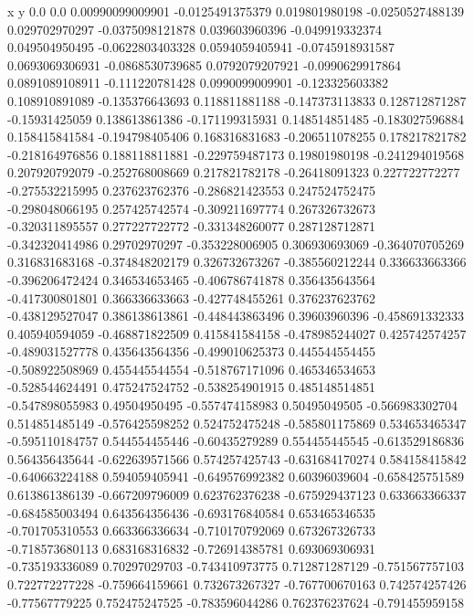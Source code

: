               x                y
            0.0              0.0
0.00990099009901  -0.0125491375379
 0.019801980198  -0.0250527488139
 0.029702970297  -0.0375098121878
 0.039603960396  -0.049919332374
 0.049504950495  -0.0622803403328
0.0594059405941  -0.0745918931587
0.0693069306931  -0.0868530739685
0.0792079207921  -0.0990629917864
0.0891089108911  -0.111220781428
0.0990099009901  -0.123325603382
 0.108910891089  -0.135376643693
 0.118811881188  -0.147373113833
 0.128712871287   -0.15931425059
 0.138613861386  -0.171199315931
 0.148514851485  -0.183027596884
 0.158415841584  -0.194798405406
 0.168316831683  -0.206511078255
 0.178217821782  -0.218164976856
 0.188118811881  -0.229759487173
  0.19801980198  -0.241294019568
 0.207920792079  -0.252768008669
 0.217821782178   -0.26418091323
 0.227722772277  -0.275532215995
 0.237623762376  -0.286821423553
 0.247524752475  -0.298048066195
 0.257425742574  -0.309211697774
 0.267326732673  -0.320311895557
 0.277227722772  -0.331348260077
 0.287128712871  -0.342320414986
  0.29702970297  -0.353228006905
 0.306930693069  -0.364070705269
 0.316831683168  -0.374848202179
 0.326732673267  -0.385560212244
 0.336633663366  -0.396206472424
 0.346534653465  -0.406786741878
 0.356435643564  -0.417300801801
 0.366336633663  -0.427748455261
 0.376237623762  -0.438129527047
 0.386138613861  -0.448443863496
  0.39603960396  -0.458691332333
 0.405940594059  -0.468871822509
 0.415841584158  -0.478985244027
 0.425742574257  -0.489031527778
 0.435643564356  -0.499010625373
 0.445544554455  -0.508922508969
 0.455445544554  -0.518767171096
 0.465346534653  -0.528544624491
 0.475247524752  -0.538254901915
 0.485148514851  -0.547898055983
  0.49504950495  -0.557474158983
  0.50495049505  -0.566983302704
 0.514851485149  -0.576425598252
 0.524752475248  -0.585801175869
 0.534653465347  -0.595110184757
 0.544554455446   -0.60435279289
 0.554455445545  -0.613529186836
 0.564356435644  -0.622639571566
 0.574257425743  -0.631684170274
 0.584158415842  -0.640663224188
 0.594059405941  -0.649576992382
  0.60396039604  -0.658425751589
 0.613861386139  -0.667209796009
 0.623762376238  -0.675929437123
 0.633663366337  -0.684585003494
 0.643564356436  -0.693176840584
 0.653465346535  -0.701705310553
 0.663366336634  -0.710170792069
 0.673267326733  -0.718573680113
 0.683168316832  -0.726914385781
 0.693069306931  -0.735193336089
  0.70297029703  -0.743410973775
 0.712871287129  -0.751567757103
 0.722772277228  -0.759664159661
 0.732673267327  -0.767700670163
 0.742574257426   -0.77567779225
 0.752475247525  -0.783596044286
 0.762376237624  -0.791455959158
